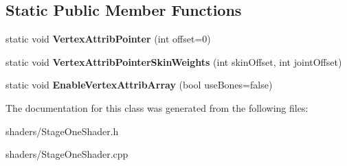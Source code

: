 \subsection*{\-Static \-Public \-Member \-Functions}
\begin{DoxyCompactItemize}
\item 
\hypertarget{classStageOneShader_ad3d7c53fc11c96c9166925e3a4fe5ba9}{static void {\bfseries \-Vertex\-Attrib\-Pointer} (int offset=0)}\label{classStageOneShader_ad3d7c53fc11c96c9166925e3a4fe5ba9}

\item 
\hypertarget{classStageOneShader_a81e968281d4547e9acb0b7e18924399d}{static void {\bfseries \-Vertex\-Attrib\-Pointer\-Skin\-Weights} (int skin\-Offset, int joint\-Offset)}\label{classStageOneShader_a81e968281d4547e9acb0b7e18924399d}

\item 
\hypertarget{classStageOneShader_a05553a57de5a17345538af0e02cf9989}{static void {\bfseries \-Enable\-Vertex\-Attrib\-Array} (bool use\-Bones=false)}\label{classStageOneShader_a05553a57de5a17345538af0e02cf9989}

\end{DoxyCompactItemize}


\-The documentation for this class was generated from the following files\-:\begin{DoxyCompactItemize}
\item 
shaders/\-Stage\-One\-Shader.\-h\item 
shaders/\-Stage\-One\-Shader.\-cpp\end{DoxyCompactItemize}

